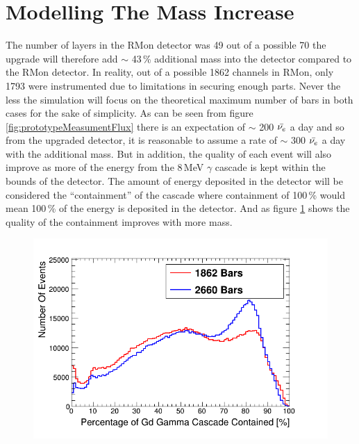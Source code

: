 \section{Modelling The Mass Increase}
The number of layers in the RMon detector was 49 out of a possible 70 the upgrade will therefore add $\sim$ 43\,\% additional mass into the detector compared to the RMon detector. In reality, out of a possible 1862 channels in RMon, only 1793 were instrumented due to limitations in securing enough parts. Never the less the simulation will focus on the theoretical maximum number of bars in both cases for the sake of simplicity. As can be seen from figure \ref{fig:prototypeMeasumentFlux} there is an expectation of $\sim$ 200 $\Bar{\nu_e}$ a day and so from the upgraded detector, it is reasonable to assume a rate of $\sim$ 300 $\Bar{\nu_e}$ a day with the additional mass. But in addition, the quality of each event will also improve as more of the energy from the 8\,MeV $\gamma$ cascade is kept within the bounds of the detector. The amount of energy deposited in the detector will be considered the ``containment'' of the cascade where containment of 100\,\% would mean 100\,\% of the energy is deposited in the detector. And as figure \ref{fig:containment_comparison} shows the quality of the containment improves with more mass. %

\begin{figure}[!h]
 \centering
 \includegraphics[width=0.7\linewidth]{Chapter4/Figs/cascadeContainmentCompare.png}
 \label{fig:containment_comparison}
\end{figure} 

